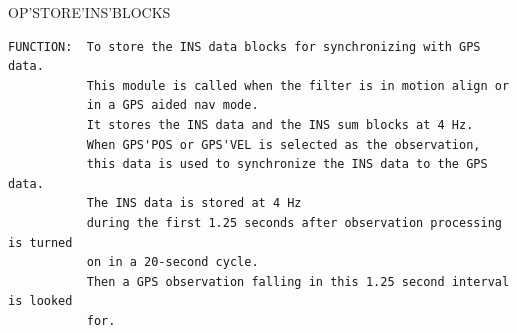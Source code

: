 \begin{frame}
OP'STORE'INS'BLOCKS
\begin{verbatim}
FUNCTION:  To store the INS data blocks for synchronizing with GPS data.
           This module is called when the filter is in motion align or 
           in a GPS aided nav mode.  
           It stores the INS data and the INS sum blocks at 4 Hz.
           When GPS'POS or GPS'VEL is selected as the observation, 
           this data is used to synchronize the INS data to the GPS data.  
           The INS data is stored at 4 Hz
           during the first 1.25 seconds after observation processing is turned 
           on in a 20-second cycle.  
           Then a GPS observation falling in this 1.25 second interval is looked
           for.

\end{verbatim}
\end{frame}
